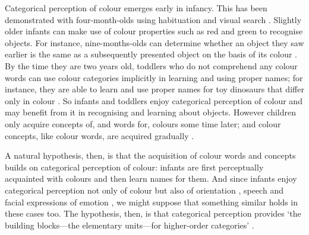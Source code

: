 \documentclass[12pt,\papersize]{extarticle}
\begin{document}

Categorical perception of colour emerges early in infancy.  This has been demonstrated with four-month-olds using habituation \citep{Bornstein:1976of} and visual search \citep{Franklin:2005xk}.   
Slightly older infants can make use of colour properties such as red and green to recognise objects.  
For instance, nine-months-olds can determine whether an object they saw earlier is the same as a subsequently presented object on the basis of its colour \citep{Wilcox:2008jk}.  
By the time they are two years old, toddlers who do not comprehend any colour words can use colour categories implicitly in learning and using proper names; for instance, they are able to learn and use proper names for toy dinosaurs that differ only in colour \citep[][Experiment 3]{Soja:1994np}.  
So infants and toddlers enjoy categorical perception of colour and may benefit from it in recognising and learning about objects.  
However children only acquire concepts of, and words for, colours some time later; and colour concepts, like colour words, are acquired gradually \citep{Pitchford:2005hm,Kowalski:2006hk,Sandhofer:1999if,Sandhofer:2006qo}. 

A natural hypothesis, then, is that the acquisition of colour words and concepts builds on categorical perception of colour: infants are first perceptually acquainted with colours and then learn names for them.
And since infants enjoy categorical perception not only of colour but also of orientation \citep{franklin:2010_hemispheric}, speech \citep{Kuhl:1987la,Kuhl:2004nv,Jusczyk:1995it} and facial expressions of emotion \citep{Etcoff:1992zd,Kotsoni:2001ph,Campanella:2002aa}, 
we might suppose that something similar holds in these cases too.
The hypothesis, then, is that categorical perception provides `the building blocks—the elementary units—for higher-order categories' \citep[p.\ 3]{Harnad:1987ej}.
\end{document}
